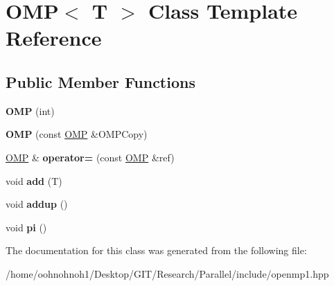 \hypertarget{classOMP}{}\section{O\+MP$<$ T $>$ Class Template Reference}
\label{classOMP}
\subsection*{Public Member Functions}
\begin{DoxyCompactItemize}
\item 
\mbox{\label{classOMP_aa2d683844b0c792f2e4b8004282c3c4f}} 
{\bfseries O\+MP} (int)
\item 
\mbox{\label{classOMP_a74734b9e39249242a4d81c4c843a8497}} 
{\bfseries O\+MP} (const \hyperlink{classOMP}{O\+MP} \&O\+M\+P\+Copy)
\item 
\mbox{\label{classOMP_a8e5d794021f25dc36d486d0a268d7713}} 
\hyperlink{classOMP}{O\+MP} \& {\bfseries operator=} (const \hyperlink{classOMP}{O\+MP} \&ref)
\item 
\mbox{\label{classOMP_a4d9450a0c0304e2cd2d705ca06e450cc}} 
void {\bfseries add} (T)
\item 
\mbox{\label{classOMP_a315d43939578681fd9ffc52259e81996}} 
void {\bfseries addup} ()
\item 
\mbox{\label{classOMP_af2e1072e3c0bf76fd14379eeca69dff9}} 
void {\bfseries pi} ()
\end{DoxyCompactItemize}


The documentation for this class was generated from the following file\+:\begin{DoxyCompactItemize}
\item 
/home/oohnohnoh1/\+Desktop/\+G\+I\+T/\+Research/\+Parallel/include/openmp1.\+hpp\end{DoxyCompactItemize}
